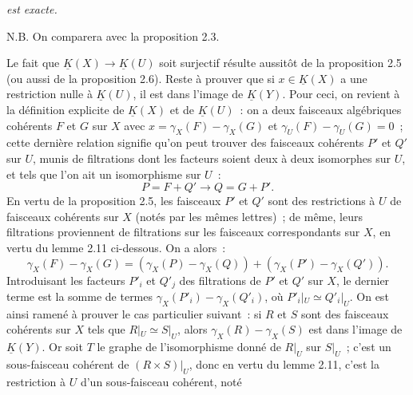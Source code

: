 \emph{est exacte.}

N.B. On comparera avec la proposition 2.3.

Le fait que $\underline K(X)\longrightarrow\underline K(U)$ soit surjectif résulte aussitôt de la proposition 2.5 (ou aussi de la proposition 2.6). Reste à prouver que si $x\in\underline K(X)$ a une restriction nulle à $\underline K(U)$, il est dans l'image de $\underline K(Y)$. Pour ceci, on revient à la définition explicite de $\underline K(X)$ et de $\underline K(U)$~: on a deux faisceaux algébriques cohérents $F$ et $G$ sur $X$ avec $x=\gamma_X(F)-\gamma_X(G)$ et $\gamma_U(F)-\gamma_U(G)=0$~; cette dernière relation signifie qu'on peut trouver des faisceaux cohérents $P'$ et $Q'$ sur $U$, munis de filtrations dont les facteurs soient deux à deux isomorphes sur $U$, et tels que l'on ait un isomorphisme sur $U$~:
\[
 P=F+Q'\longrightarrow Q=G+P'.
\]
En vertu de la proposition 2.5, les faisceaux $P'$ et $Q'$ sont des restrictions à $U$ de faisceaux cohérents sur $X$ (notés par les mêmes lettres)~; de même, leurs filtrations proviennent de filtrations sur les faisceaux correspondants sur $X$, en vertu du lemme 2.11 ci-dessous. On a alors~:
\[
 \gamma_X(F)-\gamma_X(G)=(\gamma_X(P)-\gamma_X(Q))+(\gamma_X(P')-\gamma_X(Q')).
\]
Introduisant les facteurs $P'_i$ et $Q'_j$ des filtrations de $P'$ et $Q'$ sur $X$, le dernier terme est la somme de termes $\gamma_X(P'_i)-\gamma_X(Q'_i)$, où $P'_i|_U\simeq Q'_i|_U$. On est ainsi ramené à prouver le cas particulier suivant~: si $R$ et $S$ sont des faisceaux cohérents sur $X$ tels que $R|_U\simeq S|_U$, alors $\gamma_X(R)-\gamma_X(S)$ est dans l'image de $\underline K(Y)$. Or soit $T$ le graphe de l'isomorphisme donné de $R|_U$ sur $S|_U$~; c'est un sous-faisceau cohérent de $(R\times S)|_U$, donc en vertu du lemme 2.11, c'est la restriction à $U$ d'un sous-faisceau cohérent, noté
